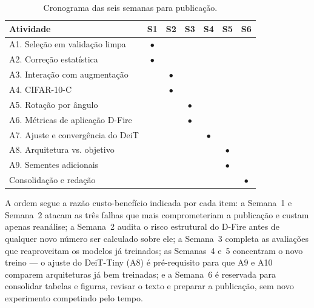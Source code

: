 \begin{table}[htb]
  \centering
  \caption{Cronograma das seis semanas para publicação.}
  \label{tab:cronograma}
  \small
  \begin{tabular}{lcccccc}
    \toprule
    Atividade & S1 & S2 & S3 & S4 & S5 & S6 \\
    \midrule
    A1. Seleção em validação limpa     & $\bullet$ &           &           &           &           &           \\
    A2. Correção estatística           & $\bullet$ &           &           &           &           &           \\
    A3. Interação com augmentação      &           & $\bullet$ &           &           &           &           \\
    A4. CIFAR-10-C                     &           & $\bullet$ &           &           &           &           \\
    A5. Rotação por ângulo             &           &           & $\bullet$ &           &           &           \\
    A6. Métricas de aplicação D-Fire   &           &           & $\bullet$ &           &           &           \\
    A7. Ajuste e convergência do DeiT  &           &           &           & $\bullet$ &           &           \\
    A8. Arquitetura vs. objetivo       &           &           &           &           & $\bullet$ &           \\
    A9. Sementes adicionais            &           &           &           &           & $\bullet$ &           \\
    Consolidação e redação             &           &           &           &           &           & $\bullet$ \\
    \bottomrule
  \end{tabular}
\end{table}

A ordem segue a razão custo-benefício indicada por cada item: a Semana~1 e Semana~2 atacam
as três falhas que mais comprometeriam a publicação e custam apenas reanálise; a
Semana~2 audita o risco estrutural do D-Fire antes de qualquer novo número ser
calculado sobre ele; a Semana~3 completa as avaliações que reaproveitam os
modelos já treinados; as Semanas~4 e~5 concentram o novo treino --- o ajuste do
DeiT-Tiny (A8) é pré-requisito para que A9 e A10 comparem arquiteturas já bem
treinadas; e a Semana~6 é reservada para consolidar tabelas e figuras, revisar o
texto e preparar a publicação, sem novo experimento competindo pelo tempo.

